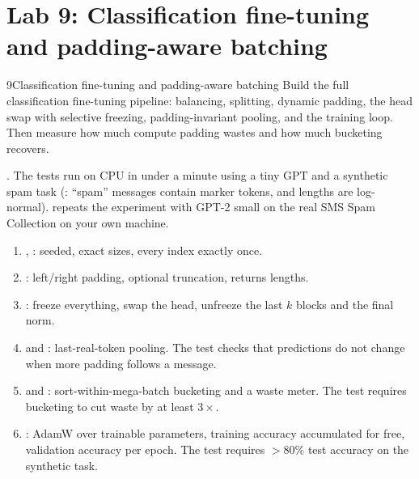 \section{Lab 9: Classification fine-tuning and padding-aware batching}\label{sec:classify:lab}

\begin{labbox}{9}{Classification fine-tuning and padding-aware batching}
Build the full classification fine-tuning pipeline: balancing, splitting, dynamic
padding, the head swap with selective freezing, padding-invariant pooling, and the
training loop. Then measure how much compute padding wastes and how much bucketing
recovers.

.
The tests run on CPU in under a minute using a tiny GPT and a synthetic spam task
(: ``spam'' messages contain marker tokens, and lengths are
log-normal).  repeats the experiment with GPT-2 small on the real SMS Spam
Collection on your own machine.

\begin{enumerate}
\item {}, : seeded, exact sizes,
every index exactly once.
\item {}: left/right padding, optional truncation, returns lengths.
\item {}: freeze everything, swap the head, unfreeze the
last $k$ blocks and the final norm.
\item {} and : last-real-token
pooling. The test checks that predictions do not change when more padding follows a
message.
\item {} and : sort-within-mega-batch
bucketing and a waste meter. The test requires bucketing to cut waste by at least
$3\times$.
\item {}: AdamW over trainable parameters, training accuracy
accumulated for free, validation accuracy per epoch. The test requires $>80\%$ test
accuracy on the synthetic task.
\end{enumerate}


\end{labbox}
